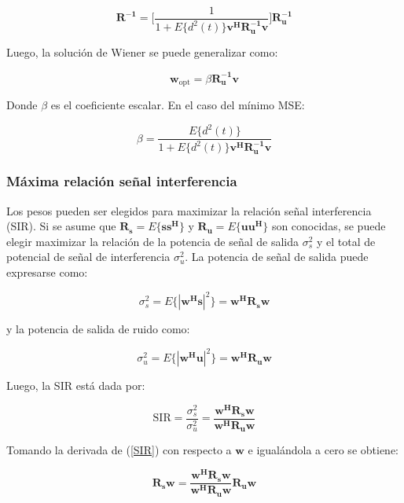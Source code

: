 \begin{equation}
\mathbf{R^{-1}} = \Bigg[ \frac{1}{1 + E\{d^2(t)\} \mathbf{v^H R_u^{-1} v}} \Bigg] \mathbf{R_u^{-1}}
\end{equation}

Luego, la solución de Wiener se puede generalizar como:

\begin{equation}
\mathbf{w}_{\text{opt}} = \beta \mathbf{R_u^{-1}v}
\end{equation}

Donde $\beta$ es el coeficiente escalar. En el caso del mínimo MSE:

\begin{equation}
\beta = \frac{E\{d^2(t)\}}{1 + E\{d^2(t)\} \mathbf{v^H R_u^{-1} v}}
\end{equation}

\subsubsection{Máxima relación señal interferencia}

Los pesos pueden ser elegidos para maximizar la relación señal interferencia (SIR). Si se asume que $\mathbf{R_s} = E\{\mathbf{s s^H}\}$ y $\mathbf{R_u} = E\{\mathbf{u u^H}\}$ son conocidas, se puede elegir maximizar la relación de la potencia de señal de salida $\sigma_s^2$ y el total de potencial de señal de interferencia $\sigma_u^2$. La potencia de señal de salida puede expresarse como:

\begin{equation}
\sigma_s^2 = E\{|\mathbf{w^H s}|^2\} = \mathbf{w^H R_s w}
\end{equation}

y la potencia de salida de ruido como:

\begin{equation}
\sigma_u^2 = E\{|\mathbf{w^H u}|^2\} = \mathbf{w^H R_u w}
\end{equation}

Luego, la SIR está dada por:

\begin{equation}
\text{SIR} = \frac{\sigma_s^2}{\sigma_u^2} = \frac{\mathbf{w^H R_s w}}{\mathbf{w^H R_u w}}
\label{SIR}
\end{equation}

Tomando la derivada de (\ref{SIR}) con respecto a $\mathbf{w}$ e igualándola a cero se obtiene:

\begin{equation}
\mathbf{R_s w} = \frac{\mathbf{w^H R_s w}}{\mathbf{w^H R_u w}} \mathbf{R_u w}
\end{equation}

